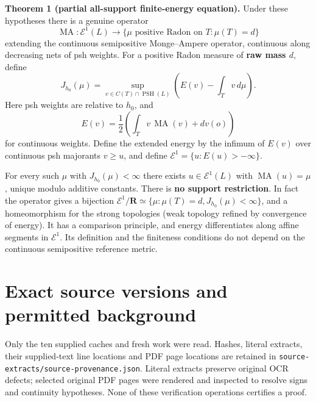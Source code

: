\documentclass[
  11pt,
]{article}
\begin{document}
\textbf{Theorem 1 (partial all-support finite-energy equation).} Under
these hypotheses there is a genuine operator \[
\operatorname{MA}:\mathcal E^1(L)\longrightarrow
\{\mu\text{ positive Radon on }T:\mu(T)=d\}
\] extending the continuous semipositive Monge--Ampere operator,
continuous along decreasing nets of psh weights. For a positive Radon
measure of \textbf{raw mass \(d\)}, define \[
J_{h_0}(\mu)=\sup_{v\in C(T)\cap\operatorname{PSH}(L)}
\left(E(v)-\int_T v\,d\mu\right).
\] Here psh weights are relative to \(h_0\), and \[
E(v)=\frac12\left(\int_T v\,\operatorname{MA}(v)+d v(o)\right)
\] for continuous weights. Define the extended energy by the infimum of
\(E(v)\) over continuous psh majorants \(v\geq u\), and define
\(\mathcal E^1=\{u:E(u)>-\infty\}\).

For every such \(\mu\) with \(J_{h_0}(\mu)<\infty\) there exists
\(u\in\mathcal E^1(L)\) with \(\operatorname{MA}(u)=\mu\), unique modulo
additive constants. There is \textbf{no support restriction}. In fact
the operator gives a bijection
\(\mathcal E^1/\mathbf R\simeq\{\mu:\mu(T)=d,J_{h_0}(\mu)<\infty\}\),
and a homeomorphism for the strong topologies (weak topology refined by
convergence of energy). It has a comparison principle, and energy
differentiates along affine segments in \(\mathcal E^1\). Its definition
and the finiteness conditions do not depend on the continuous
semipositive reference metric.

\section{Exact source versions and permitted
background}\label{exact-source-versions-and-permitted-background}

Only the ten supplied caches and fresh work were read. Hashes, literal
extracts, their supplied-text line locations and PDF page locations are
retained in \texttt{source-extracts/source-provenance.json}. Literal
extracts preserve original OCR defects; selected original PDF pages were
rendered and inspected to resolve signs and continuity hypotheses. None
of these verification operations certifies a proof.
\end{document}
